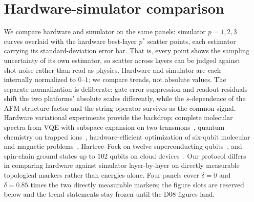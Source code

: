 \section{Hardware-simulator comparison}
\label{sec:comparison}

We compare hardware and simulator on the same panels: simulator
$p=1,2,3$ curves overlaid with the hardware best-layer $p^*$ scatter
points, each estimator carrying its standard-deviation error bar.
That is, every point shows the sampling uncertainty of its own
estimator, so scatter across layers can be judged against shot noise
rather than read as physics.
Hardware and simulator are each internally normalized to $0$--$1$;
we compare trends, not absolute values. The separate normalization is
deliberate: gate-error suppression and readout residuals shift the two
platforms' absolute scales differently, while the $s$-dependence of the
AFM structure factor and the string operator survives as the common
signal.
Hardware variational experiments provide the backdrop: complete molecular
spectra from VQE with subspace expansion on two transmons~\cite{colless2018robust},
quantum chemistry on trapped
ions~\cite{hempel2018quantum}, hardware-efficient optimization of
six-qubit molecular and magnetic
problems~\cite{kandala2017hardware}, Hartree--Fock on twelve
superconducting qubits~\cite{google2020hartree}, and spin-chain ground
states up to $102$ qubits on cloud
devices~\cite{yu2023simulating}. Our protocol differs in comparing
hardware against simulator layer-by-layer on directly measurable
topological markers rather than energies alone.
Four panels cover $\delta=0$ and $\delta=0.85$ times the two
directly measurable markers; the figure slots are reserved below and the
trend statements stay frozen until the D08 figures land.

